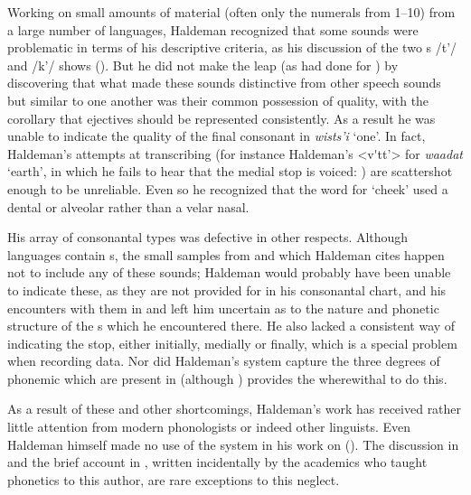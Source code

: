 \documentclass[output=paper]{LSP/langsci}
\begin{document}
Working on small amounts of material (often only the numerals from 1--10) from a large number of languages, Haldeman recognized that some sounds were problematic in terms of his descriptive criteria, as his discussion of the two s   /t'/ and  /k'/ shows (\citealt[99: \S448; 131: \S574]{Haldeman1860}).  But he did not make the leap (as \citealt{Garcia1760} had done for ) by discovering that what made these sounds distinctive from other speech sounds but similar to one another was their common possession of  quality, with the corollary that ejectives should be represented consistently.  As a result he was unable to indicate the  quality of the final consonant in  \textit{wists'i} `one'.  In fact, Haldeman's attempts at transcribing  (for instance Haldeman's <v\'{}tt'> for \textit{waadat} `earth', in which he fails to hear that the medial stop is voiced: \citealt[135, \S633]{Haldeman1860}) are scattershot enough to be unreliable. Even so he recognized that the  word for `cheek'  used a dental or alveolar rather than a velar nasal.    

 
His array of consonantal types was defective in other respects. Although  languages contain s, the small samples from  and  which Haldeman cites happen not to include any of these sounds; Haldeman would probably have been unable to indicate these, as they are not provided for in his consonantal chart, and his encounters with them in  and  left him uncertain as to the nature and phonetic structure of the s which he encountered there.  He also lacked a consistent way of indicating the  stop, either initially, medially or finally, which is a special problem when recording  data. Nor did Haldeman's system capture the three degrees of phonemic  which are present in  (although \citealt[80, \S353--355]{Haldeman1860}) provides the wherewithal to do this.  
 

As a result of these and other shortcomings, Haldeman's work has received rather little attention from modern phonologists or indeed other linguists.  Even Haldeman himself made no use of the system in his work on  (\citealt{Haldeman1872}).  The discussion in \citet{Pilling1887} and the brief account in \citet{KellyLocal1989}, written incidentally by the academics who taught phonetics to this author, are  rare exceptions to this neglect.   
\end{document}
